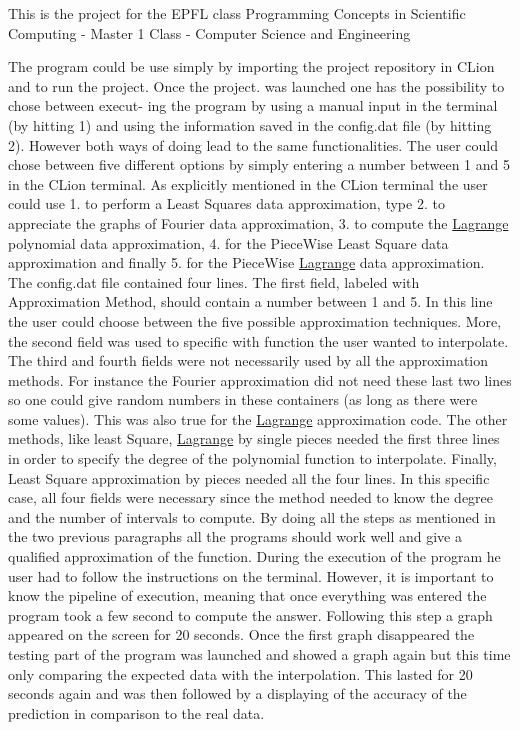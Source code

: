 This is the project for the E\+P\+FL class Programming Concepts in Scientific Computing -\/ Master 1 Class -\/ Computer Science and Engineering

The program could be use simply by importing the project repository in C\+Lion and to run the project. Once the project. was launched one has the possibility to chose between execut-\/ ing the program by using a manual input in the terminal (by hitting 1) and using the information saved in the config.\+dat file (by hitting 2). However both ways of doing lead to the same functionalities. The user could chose between five different options by simply entering a number between 1 and 5 in the C\+Lion terminal. As explicitly mentioned in the C\+Lion terminal the user could use 1. to perform a Least Squares data approximation, type 2. to appreciate the graphs of Fourier data approximation, 3. to compute the \mbox{\hyperlink{class_lagrange}{Lagrange}} polynomial data approximation, 4. for the Piece\+Wise Least Square data approximation and finally 5. for the Piece\+Wise \mbox{\hyperlink{class_lagrange}{Lagrange}} data approximation. The config.\+dat file contained four lines. The first field, labeled with Approximation Method, should contain a number between 1 and 5. In this line the user could choose between the five possible approximation techniques. More, the second field was used to specific with function the user wanted to interpolate. The third and fourth fields were not necessarily used by all the approximation methods. For instance the Fourier approximation did not need these last two lines so one could give random numbers in these containers (as long as there were some values). This was also true for the \mbox{\hyperlink{class_lagrange}{Lagrange}} approximation code. The other methods, like least Square, \mbox{\hyperlink{class_lagrange}{Lagrange}} by single pieces needed the first three lines in order to specify the degree of the polynomial function to interpolate. Finally, Least Square approximation by pieces needed all the four lines. In this specific case, all four fields were necessary since the method needed to know the degree and the number of intervals to compute. By doing all the steps as mentioned in the two previous paragraphs all the programs should work well and give a qualified approximation of the function. During the execution of the program he user had to follow the instructions on the terminal. However, it is important to know the pipeline of execution, meaning that once everything was entered the program took a few second to compute the answer. Following this step a graph appeared on the screen for 20 seconds. Once the first graph disappeared the testing part of the program was launched and showed a graph again but this time only comparing the expected data with the interpolation. This lasted for 20 seconds again and was then followed by a displaying of the accuracy of the prediction in comparison to the real data. 